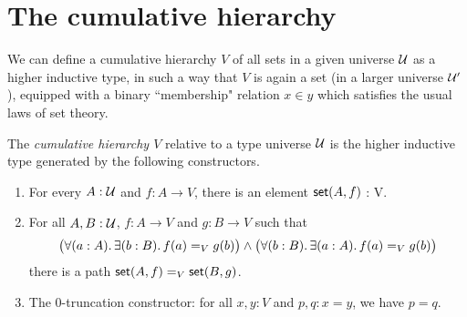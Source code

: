 %
%
%
%

\section{The cumulative hierarchy}
\label{sec:cumulative-hierarchy}

We can define a cumulative hierarchy $V$ of all sets in a given universe $\UU$ as a higher inductive type, in such a way that $V$ is again a set (in a larger universe $\UU'$), equipped with a binary ``membership" relation $x\in y$ which satisfies the usual laws of set theory.

\begin{defn}
  The \emph{cumulative hierarchy $V$} relative to a type universe $\UU$ is the
  higher inductive type generated by the following constructors.
  \begin{enumerate}
  \item For every $A : \UU$ and $f : A \to V$, there is an element $\vset(A, f)$ : V.
  \item For all $A, B : \UU$, $f : A \to V$ and $g : B \to V$ such that
    \begin{equation} \label{eq:V-path}
      \big(\fall{a:A} \exis{b:B} \id[V]{f(a)}{g(b)}\big) \land \big(\fall{b:B} \exis{a:A} \id[V]{f(a)}{g(b)}\big)
    \end{equation}
    there is a path $\id[V]{\vset(A,f)}{\vset(B,g)}$.
  \item The 0-truncation constructor: for all $x,y:V$ and $p,q:x=y$, we have $p=q$.
  \end{enumerate}
\end{defn}

